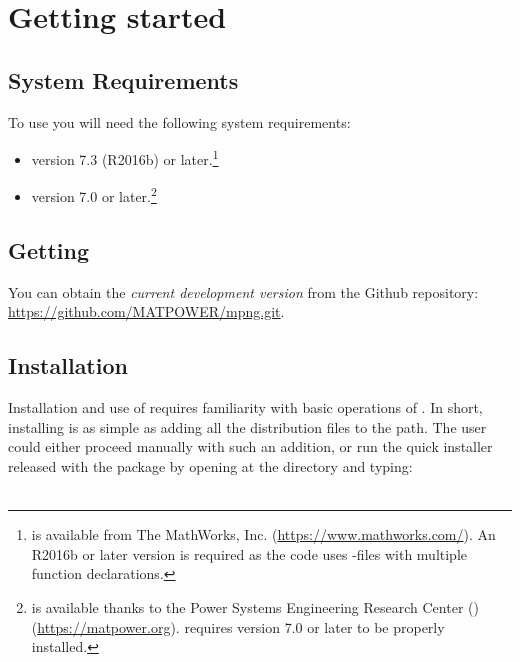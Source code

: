\chapter{Getting started}
\label{chap:get_started}

\section{System Requirements}
\label{sec:requirements}

To use \mpng{} you will need the following system requirements:

\begin{itemize}
	\item[\checkmark] \matlab{}\textsuperscript{\tiny \textregistered} version 7.3 (R2016b) or later.\footnote{\matlab{} is available from The MathWorks, Inc. (\url{https://www.mathworks.com/}). An R2016b or later \matlab{} version is required as the \mpng{} code uses \matlab{}-files with multiple function declarations.}
	
	\item[\checkmark] \matpower{} version 7.0 or later.\footnote{\matpower{} is available thanks to the Power Systems Engineering Research Center (\pserc) (\url{https://matpower.org}). \mpng{} requires \matpower{} version 7.0 or later to be properly installed.}
\end{itemize}

\section{Getting \mpng{}}
\label{sec:get_mpng}

You can obtain the \emph{current development version} from the \matpower{} Github repository: \url{https://github.com/MATPOWER/mpng.git}.

\section{Installation}
\label{sec:install}

Installation and use of \mpng{} requires familiarity with basic operations of \matlab{}. In short, installing \mpng{} is as simple as adding all the distribution files to the \matlab{} path. The user could either proceed manually with such an addition, or run the quick installer released with the package by opening \matlab{} at the \mpngpath{} directory and typing:\\

\\

